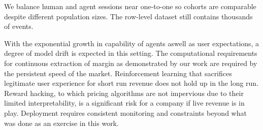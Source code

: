 We balance human and agent sessions near one-to-one so cohorts are comparable despite different population sizes. The row-level dataset still contains thousands of events.

With the exponential growth in capability of agents aswell as user expectations, a degree of model drift is expected in this setting. The computational requirements for continuous extraction of margin as demonstrated by our work are required by the persistent speed of the market. Reinforcement learning that sacrifices legitimate user experience for short run revenue does not hold up in the long run. Reward hacking, to which pricing algorithms are not impervious due to their limited interpretability, is a significant risk for a company if live revenue is in play. Deployment requires consistent monitoring and constraints beyond what was done as an exercise in this work.

